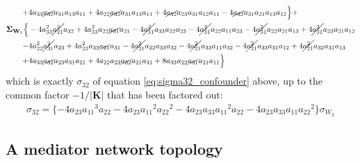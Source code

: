 \documentclass{article}
\begin{document}
\begin{equation}
\begin{aligned}
+& 4 a_{33} \cancel{a_{32}} a_{31} a_{13} a_{11} + 4 a_{22} \cancel{a_{32}} a_{31} a_{13} a_{11} + 4 \cancel{a_{32}} a_{23} a_{31} a_{12} a_{11} - 4 \cancel{a_{32}} a_{31} a_{21} a_{13} a_{12}\Bigr\} + \\
\mathbf{\Sigma}_{\textbf{W}_{1}} \Bigl\{& -4a_{33}^{2} \cancel{a_{21}^{2}} a_{32} + 4 a_{33}^{2} a_{22} \cancel{a_{31}} a_{21} - 4 \cancel{a_{31}^{2}} a_{33} a_{22} a_{23} - 4 \cancel{a_{31}^{2}} a_{22} a_{11} a_{23} - 4 \cancel{a_{31}^{2}} a_{22} a_{21} a_{13} + 4 \cancel{a_{31}^{2}} a_{23} a_{21} a_{12} \\
-& 4 a_{22}^{2} \cancel{a_{31}^{2}} a_{23} + 4 a_{22}^{2} a_{33} \cancel{a_{21}} a_{31} - 4 \cancel{a_{21}^{2}} a_{22} a_{33} a_{32} - 4 \cancel{a_{21}^{2}} a_{33} a_{11} a_{32} - 4 \cancel{a_{21}^{2}} a_{33} a_{31} a_{12} + 4 \cancel{a_{21}^{2}} a_{32} a_{31} a_{13} \\
+& 4 a_{33} \cancel{a_{32}} a_{23} a_{31} a_{21} + 4 a_{22} a_{23} \cancel{a_{32}} a_{21} a_{31} + 8 a_{33} a_{22} \cancel{a_{31}} a_{21} a_{11}\Bigr\}
\end{aligned}
\end{equation}
which is exactly $\sigma_{32}$ of equation \ref{eq:sigma32_confounder} above, up to the common factor $-1/|\mathbf{K}|$ that has been factored out:
\begin{align*}
\sigma_{32}= \{ -4a_{23}{a_{11}}^3a_{22}-4a_{23}{a_{11}}^2{a_{22}}^2-4a_{23}a_{33}{a_{11}}^2a_{22}-4a_{23}a_{33}a_{11}{a_{22}}^2 \} \sigma_{W_{3}}
\end{align*}



\subsection*{A mediator network topology}
\end{document}
